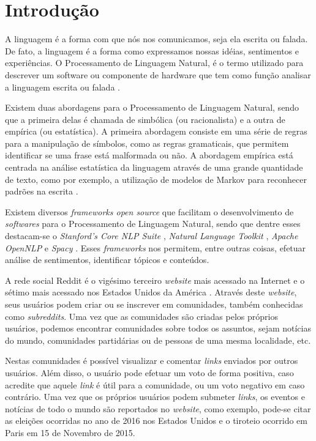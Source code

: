 \chapter{Introdução}
\label{chap:introducao}
A linguagem é a forma com que nós nos comunicamos, seja ela escrita ou
falada. De fato, a linguagem é a forma como
expressamos nossas idéias, sentimentos e experiências. O Processamento de
Linguagem Natural, é o termo utilizado para descrever um software ou componente
de hardware que tem como função analisar a linguagem escrita ou falada
\cite{jacksonmoulinier2007}.

Existem duas abordagens para o Processamento de Linguagem Natural, sendo que a
primeira delas é chamada de simbólica (ou racionalista) e a outra de empírica
(ou estatística).
A primeira abordagem consiste em uma série de regras para a manipulação de
símbolos, como as regras gramaticais, que permitem identificar se uma frase está
malformada ou não. A abordagem empírica está centrada na análise estatística da
linguagem através de uma grande quantidade de texto, como por exemplo, a
utilização de modelos de Markov para reconhecer padrões na escrita \cite{jacksonmoulinier2007}.

Existem diversos \textit{frameworks open source} que facilitam o desenvolvimento
de \textit{softwares} para o Processamento de Linguagem Natural, sendo que
dentre esses destacam-se o \textit{Stanford's Core NLP Suite} \cite{corenlp},
\textit{Natural Language Toolkit} \cite{nltk}, \textit{Apache OpenNLP} \cite{opennlp} e \textit{Spacy}
\cite{spacy}.
Esses \textit{frameworks} nos permitem, entre outras coisas, efetuar análise de
sentimentos, identificar tópicos e conteúdos.

A rede social Reddit é o vigésimo terceiro \textit{website} mais acessado na
Internet e o sétimo mais acessado nos Estados Unidos da América \cite{alexa}.
Através deste \textit{website}, seus usuários podem criar ou se inscrever em
comunidades, também conhecidas como \textit{subreddits}.
Uma vez que as comunidades são criadas pelos próprios usuários, podemos encontrar
comunidades sobre todos os assuntos, sejam notícias do mundo, comunidades
partidárias ou de pessoas de uma mesma localidade, etc.

Nestas comunidades é possível visualizar e comentar \textit{links} enviados por
outros usuários.
Além disso, o usuário pode efetuar um voto de forma positiva, caso acredite que
aquele \textit{link} é útil para a comunidade, ou um voto negativo em caso
contrário.
Uma vez que os próprios usuários podem submeter \textit{links}, os eventos e
notícias de todo o mundo são reportados no \textit{website}, como exemplo,
pode-se citar as eleições ocorridas no ano de 2016 nos Estados Unidos e o
tiroteio ocorrido em Paris em 15 de Novembro de 2015.

